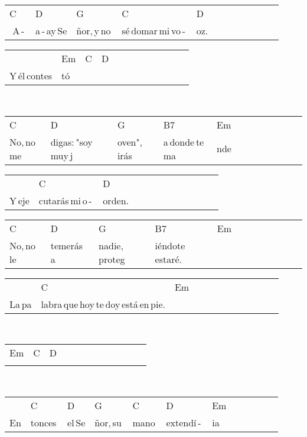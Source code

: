 \begin{multicols}{2}
\begin{minipage}{\columnwidth}
\noindent
\begin{tabular}{llllllllllll}
C&D&G&C&D\\
\,\,A\,-\,&a\,-\,ay\,Se&ñor,\,y\,no\,&sé\,domar\,mi\,vo\,-\,&oz.
\end{tabular}

\noindent
\begin{tabular}{llllllllllll}
&Em&C&D\\
Y\,él\,contes&tó\,\,\,&\,\,&
\end{tabular}
\end{minipage}\\

\noindent
\begin{minipage}{\columnwidth}
\noindent
\noindent
\begin{tabular}{llllllllllll}
C&D&G&B7&Em\\
No,\,no\,me\,&digas:\,"soy\,muy\,j&oven",\,irás\,&a\,donde\,te\,ma&nde
\end{tabular}

\noindent
\begin{tabular}{llllllllllll}
&C&D\\
Y\,eje&cutarás\,mi\,o\,-\,&orden.
\end{tabular}

\noindent
\begin{tabular}{llllllllllll}
C&D&G&B7&Em\\
No,\,no\,le\,&temerás\,a\,&nadie,\,proteg&iéndote\,estaré.&
\end{tabular}

\noindent
\begin{tabular}{llllllllllll}
&C&Em\\
La\,pa&labra\,que\,hoy\,te\,doy\,está\,en\,pie.&
\end{tabular}
\end{minipage}\\

\noindent
\begin{minipage}{\columnwidth}
\noindent
\noindent
\begin{tabular}{llllllllllll}
Em&C&D\\
\quad\quad\quad\quad&\quad\quad\quad&
\end{tabular}
\end{minipage}\\

\noindent
\begin{minipage}{\columnwidth}
\noindent
\noindent
\begin{tabular}{llllllllllll}
&C&D&G&C&D&Em\\
En&tonces\,&el\,Se&ñor,\,su\,&mano\,&extendí\,-\,&ia
\end{tabular}


\end{minipage}
\end{multicols}
